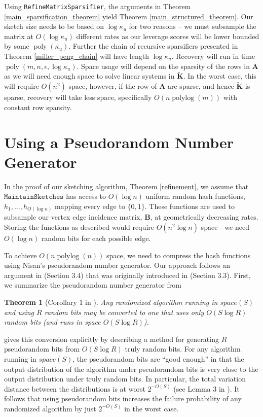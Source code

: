 \documentclass[11pt]{article}
\newcommand{\bv}[1]{\mathbf{#1}}
\newcommand{\maintain}{\texttt{MaintainSketches}}
\newcommand{\plog}{\mathop\mathrm{polylog}}
\newcommand{\poly}{\mathop\mathrm{poly}}
\newtheorem{theorem}{Theorem}
\begin{document}
Using \texttt{RefineMatrixSparsifier}, the arguments in Theorem \ref{main_sparsification_theorem}
yield Theorem \ref{main_structured_theorem}. Our sketch size needs to be based on $\log \kappa_u$ for two reasons -- we must subsample the matrix at $O(\log \kappa_u)$ different rates as our leverage scores will be lower bounded by some $\poly(\kappa_u)$. Further the chain of recursive sparsifiers presented in Theorem \ref{miller_peng_chain} will have length $\log \kappa_u$. Recovery will run in time $\poly(m,n,\epsilon, \log \kappa_u)$. Space usage will depend on the sparsity of the rows in $\bv{A}$ as we will need enough space to solve linear systems in $\bv{\tilde K}$. In the worst case, this will require $O(n^2)$ space, however, if the row of $\bv{A}$ are sparse, and hence $\bv{\tilde K}$ is sparse, recovery will take less space, specifically $O(n \plog(m))$ with constant row sparsity. 
\section{Using a Pseudorandom Number Generator}\label{pseudorandomness}
In the proof of our sketching algorithm, Theorem \ref{refinement}, we assume that $\maintain$ has access to $O(\log n)$ uniform random hash functions, $h_1,\ldots,h_{O(\log n)}$ mapping every edge to $\{0,1\}$. These functions are used to subsample our vertex edge incidence matrix, $\bv{B}$, at geometrically decreasing rates. Storing the functions as described would require $O(n^2\log n)$ space - we need $O(\log n)$ random bits for each possible edge. 

To achieve $O(n\plog(n))$ space, we need to compress the hash functions using Nisan's pseudorandom number generator. Our approach follows an argument in \cite{gssss} (Section 3.4) that was originally introduced in \cite{indyk2000stable} (Section 3.3). First, we summarize the pseudorandom number generator from \cite{nisan1992pseudorandom}

\begin{theorem}[Corollary 1 in \cite{nisan1992pseudorandom}]\label{pseudorandomPrimitive}
Any randomized algorithm running in $space(S)$ and using $R$ random bits may be converted to one that uses only $O(S\log R)$ random bits (and runs in space $O(S\log R)$).
\end{theorem}
\cite{nisan1992pseudorandom} gives this conversion explicitly by describing a method for generating $R$ pseudorandom bits from $O(S\log R)$ truly random bits. For any algorithm running in $space(S)$, the pseudorandom bits are ``good enough'' in that the output distribution of the algorithm under pseudorandom bits is very close to the output distribution under truly random bits. In particular, the total variation distance between the distributions is at worst $2^{-O(S)}$ (see Lemma 3 in \cite{nisan1992pseudorandom}). It follows that using pseudorandom bits increases the failure probability of any randomized algorithm by just $2^{-O(S)}$ in the worst case.
\end{document}
